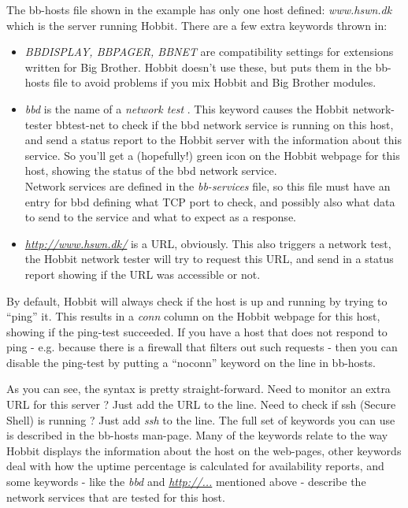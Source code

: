  The bb-hosts file shown in the example has only one host defined: \emph{www.hswn.dk}
 which is the server running Hobbit. There are a few extra keywords thrown in:
\begin{itemize}
\item \emph{BBDISPLAY, BBPAGER, BBNET}
 are compatibility settings for extensions written for Big Brother. Hobbit doesn't use these, but puts them in the bb-hosts file to avoid problems if you mix Hobbit and Big Brother modules.
\item \emph{bbd}
 is the name of a \emph{network test}
. This keyword causes the Hobbit network-tester bbtest-net to check if the bbd network service is running on this host, and send a status report to the Hobbit server with the information about this service. So you'll get a (hopefully!) green icon on the Hobbit webpage for this host, showing the status of the bbd network service.\\ 
 Network services are defined in the \emph{bb-services}
 file, so this file must have an entry for bbd defining what TCP port to check, and possibly also what data to send to the service and what to expect as a response.
\item \emph{\url{http://www.hswn.dk/}}
 is a URL, obviously. This also triggers a network test, the Hobbit network tester will try to request this URL, and send in a status report showing if the URL was accessible or not.

\end{itemize}


 By default, Hobbit will always check if the host is up and running by trying to ``ping'' it. This results in a \emph{conn}
 column on the Hobbit webpage for this host, showing if the ping-test succeeded. If you have a host that does not respond to ping - e.g. because there is a firewall that filters out such requests - then you can disable the ping-test by putting a ``noconn'' keyword on the line in bb-hosts.


 As you can see, the syntax is pretty straight-forward. Need to monitor an extra URL for this server ? Just add the URL to the line. Need to check if ssh (Secure Shell) is running ? Just add \emph{ssh}
 to the line. The full set of keywords you can use is described in the bb-hosts man-page. Many of the keywords relate to the way Hobbit displays the information about the host on the web-pages, other keywords deal with how the uptime percentage is calculated for availability reports, and some keywords - like the \emph{bbd}
 and \emph{\url{http://...}}
 mentioned above - describe the network services that are tested for this host.
